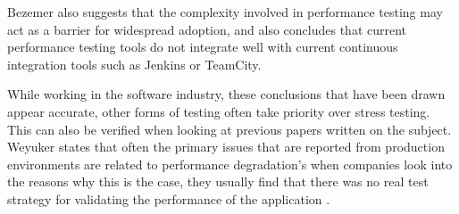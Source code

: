Bezemer also suggests that the complexity involved in performance testing may act as a barrier for widespread adoption, and also concludes that current performance testing tools do not integrate well with current continuous integration tools such as Jenkins or TeamCity.

While working in the software industry, these conclusions that have been drawn appear accurate, other forms of testing often take priority over stress testing. This can also be verified when looking at previous papers written on the subject. Weyuker states that often the primary issues that are reported from production environments are related to performance degradation's when companies look into the reasons why this is the case, they usually find that there was no real test strategy for validating the performance of the application \cite{888628}. 